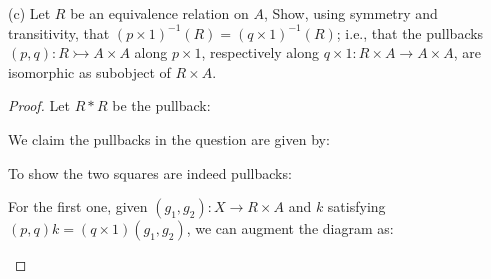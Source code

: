 \documentclass[a4paper]{article}
\DeclareMathOperator{\pr}{\sf pr}
\begin{document}
(c) Let $R$ be an equivalence relation on $A$, Show, using symmetry and transitivity, that $(p\times 1)^{-1}(R)=(q\times 1)^{-1}(R)$; i.e., that the pullbacks $(p,q):R\rightarrowtail A\times A$ along $p\times 1$, respectively along $q\times 1:R\times A\to A\times A$, are isomorphic as subobject of $R\times A$.

\begin{proof}

    Let $R* R$ be the pullback:

    \begin{center}
    \end{center}


    We claim the pullbacks in the question are given by:

    \begin{center}
    \end{center}

    \begin{center}
    \end{center}

    To show the two squares are indeed pullbacks:

    For the first one, given $(g_1,g_2):X\to R\times A$ and $k$ satisfying $(p,q)k = (q\times 1)(g_1,g_2)$, we can augment the diagram as:

    \begin{center}
    \end{center}


\end{proof}
\end{document}
